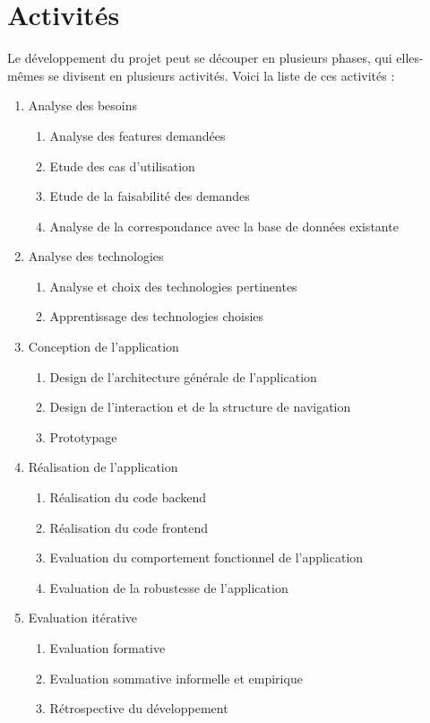 \section{Activités}

Le développement du projet peut se découper en plusieurs phases, qui elles-mêmes se divisent en plusieurs activités. Voici la liste de ces activités :

\begin{enumerate}
	\item Analyse des besoins
	\begin{enumerate}
		\item Analyse des features demandées
		\item Etude des cas d’utilisation
		\item Etude de la faisabilité des demandes
		\item Analyse de la correspondance avec la base de données existante
	\end{enumerate}
	\item Analyse des technologies
	\begin{enumerate}
		\item Analyse et choix des technologies pertinentes
		\item Apprentissage des technologies choisies
	\end{enumerate}
	\item Conception de l’application
	\begin{enumerate}
		\item Design de l’architecture générale de l’application
		\item Design de l’interaction et de la structure de navigation
		\item Prototypage
	\end{enumerate}
	\item Réalisation de l’application
	\begin{enumerate}
		\item Réalisation du code backend
		\item Réalisation du code frontend
		\item Evaluation du comportement fonctionnel de l’application
		\item Evaluation de la robustesse de l’application
	\end{enumerate}
	\item Evaluation itérative
	\begin{enumerate}
		\item Evaluation formative
		\item Evaluation sommative informelle et empirique
		\item Rétrospective du développement
	\end{enumerate}
\end{enumerate}

